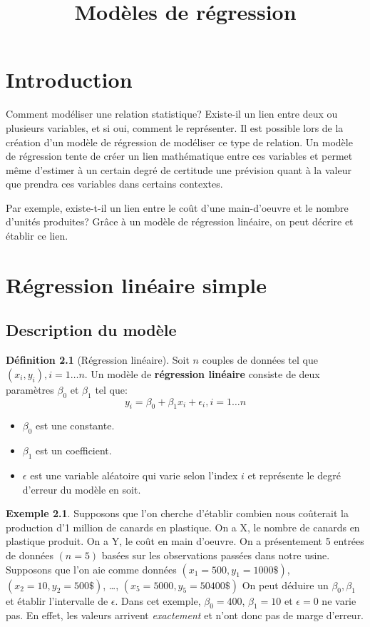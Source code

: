 \documentclass[12pt]{book}
\title{Modèles de régression}
\def\sep{\phantom{}}
\theoremstyle{definition}
\newtheorem{definition}{Définition}[section]
\newtheorem*{example}{Exemple}
\begin{document}
\chapter{Introduction}
Comment modéliser une relation statistique? Existe-il un lien entre deux ou plusieurs variables, et si oui, comment
le représenter. Il est possible lors de la création d'un modèle de régression de modéliser ce type de relation. Un modèle de régression tente de créer un lien mathématique entre ces 
variables et permet même d'estimer à un certain degré de certitude une prévision quant à la valeur que prendra ces 
variables dans certains contextes.

Par exemple, existe-t-il un lien entre le coût d'une main-d'oeuvre et le nombre d'unités produites? Grâce à un modèle de régression
linéaire, on peut décrire et établir ce lien.

\chapter{Régression linéaire simple}
\section{Description du modèle}
\begin{definition}[Régression linéaire]
    \label{def:regression_lineaire}
    Soit $n$ couples de données tel que $(x_i, y_i), i=1 \dots n$. Un modèle de \textbf{régression linéaire} consiste 
    de deux paramètres $\beta_0$ et $\beta_1$ tel que: 
    $$  y_i = \beta_0 + \beta_1 x_i + \epsilon_i, i=1 \dots n $$
\end{definition}

\begin{itemize}
    \item $\beta_0$ est une constante.
    \item $\beta_1$ est un coefficient.
    \item $\epsilon$ est une variable aléatoire qui varie selon l'index $i$ et représente le degré d'erreur du modèle en soit.
\end{itemize}

\begin{example}
    Supposons que l'on cherche d'établir combien nous coûterait la production d'1 million de canards en plastique.
    On a X, le nombre de canards en plastique produit. \sep
    On a Y, le coût en main d'oeuvre. \sep
    On a présentement 5 entrées de données $(n=5)$ basées sur les observations passées dans notre usine. \sep
    Supposons que l'on aie comme données $(x_1 = 500, y_1 = 1000\$)$,$ (x_2 = 10, y_2 = 500\$)$, \dots, $(x_5 = 5000, y_5 = 50400\$)$ \sep 
    On peut déduire un $\beta_0, \beta_1 $ et établir l'intervalle de $\epsilon$. \sep
    Dans cet exemple, $\beta_0 = 400$, $\beta_1 = 10$ \sep 
    et $\epsilon = 0$ ne varie pas. En effet, les valeurs arrivent \textit{exactement} et n'ont donc pas de marge d'erreur.
\end{example}
\end{document}
